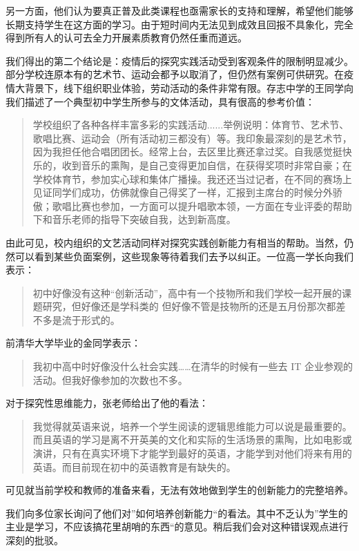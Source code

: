 \documentclass[12pt,UTF8]{ctexart}
\begin{document}
\par {
	
	另一方面，他们认为要真正普及此类课程也亟需家长的支持和理解，希望他们能够长期支持学生在这方面的学习。由于短时间内无法见到成效且回报不具象化，完全得到所有人的认可去全力开展素质教育仍然任重而道远。
}
\par {
	
	我们得出的第二个结论是：疫情后的探究实践活动受到客观条件的限制明显减少。部分学校连原本有的艺术节、运动会都予以取消了，但仍然有案例可供研究。在疫情大背景下，线下组织职业体验，劳动活动的条件非常有限。存志中学的王同学向我们描述了一个典型初中学生所参与的文体活动，具有很高的参考价值：
	\begin{quote}
		\kaishu
		学校组织了各种各样丰富多彩的实践活动......举例说明：体育节、艺术节、歌唱比赛、运动会（所有活动初三都没有）等。我印象最深刻的是艺术节，因为我担任他合唱团团长。经常上台，去区里比赛还拿过奖。自我感觉挺快乐的，收到音乐的熏陶，是自己变得更加自信，在获得奖项时非常自豪；在学校体育节，参加实心球和集体广播操。我还还当过记者，在不同的赛场上见证同学们成功，仿佛就像自己得奖了一样，汇报到主席台的时候分外骄傲；歌唱比赛也参加，一方面可以提升唱歌本领，一方面在专业评委的帮助下和音乐老师的指导下突破自我，达到新高度。
	\end{quote}
	由此可见，校内组织的文艺活动同样对探究实践创新能力有相当的帮助。当然，仍然可以看到某些负面案例，这些现象等待着我们去予以纠正。一位高一学长向我们表示：
	\begin{quote}
		\kaishu 初中好像没有这种“创新活动”，高中有一个技物所和我们学校一起开展的课题研究，但好像还是学科类的
		但好像不管是技物所的还是五月份那次都差不多是流于形式的。
	\end{quote}
	前清华大学毕业的金同学表示：
	\begin{quote}
		\kaishu 我初中高中时好像没什么社会实践……在清华的时候有一些去 IT 企业参观的活动。但我好像参加的次数也不多。
	\end{quote}
	对于探究性思维能力，张老师给出了他的看法：
	\begin{quote}
		\kaishu
		我觉得就英语来说，培养一个学生阅读的逻辑思维能力可以说是最重要的。而且英语的学习是离不开英美的文化和实际的生活场景的熏陶，比如电影或演讲，只有在真实环境下才能学到最好的英语，才能学到对他们将来有用的英语。而目前现在初中的英语教育是有缺失的。
	\end{quote}
	可见就当前学校和教师的准备来看，无法有效地做到学生的创新能力的完整培养。
}
\par {
	我们向多位家长询问了他们对”如何培养创新能力“的看法。其中不乏认为”学生的主业是学习，不应该搞花里胡哨的东西“的意见。稍后我们会对这种错误观点进行深刻的批驳。
}
\end{document}
